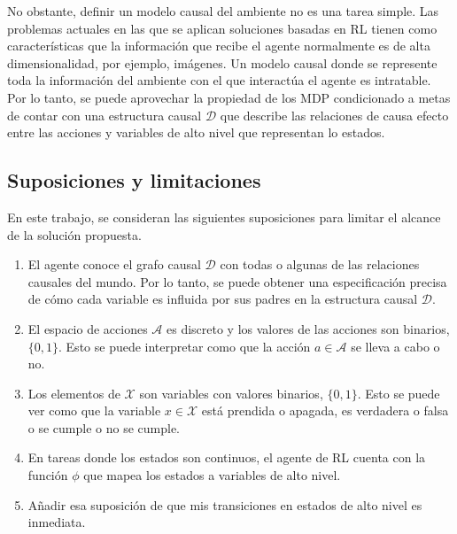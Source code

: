 No obstante, definir un modelo causal del ambiente no es una tarea simple.
Las problemas actuales en las que se aplican soluciones 
basadas en RL tienen como características que la información
que recibe el agente normalmente es de alta dimensionalidad, por 
ejemplo, imágenes. Un modelo causal donde se represente toda
la información del ambiente con el que interactúa el agente
es intratable. 
Por lo tanto, se puede aprovechar la propiedad de los MDP condicionado a metas de contar con una
estructura causal $\mathcal{D}$ que describe las relaciones de causa efecto entre las acciones 
y variables de alto nivel que representan lo estados.


\subsection{Suposiciones y limitaciones}

En este trabajo, se consideran  las siguientes suposiciones para limitar el alcance de la solución propuesta.

\begin{enumerate}
    \item El agente conoce el grafo causal $\mathcal{D}$ con todas o
    algunas de las relaciones causales del mundo.
    Por lo tanto,
se puede obtener una especificación precisa de cómo cada variable es influida por sus padres
en la estructura causal $\mathcal{D}$.
    \item El espacio de acciones $\mathcal{A}$ es discreto y los valores de las acciones son binarios, $\{0, 1\}$. Esto se puede interpretar como que la acción $a \in \mathcal{A}$ se lleva a cabo o no.
    \item Los elementos de $\mathcal{X}$ son variables con valores binarios, $\{0,1\}$. Esto se puede ver como que la variable $x\in \mathcal{X}$
    está prendida o apagada, es verdadera o falsa o se cumple o no se cumple.
    \item En tareas donde los estados son continuos, el agente de RL cuenta con la función $\phi$ que mapea los estados a variables de alto nivel.
    \item {\color{magenta}Añadir esa suposición de que mis transiciones en estados de alto nivel es inmediata.}
\end{enumerate}


